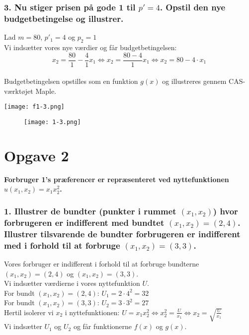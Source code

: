 \documentclass[a4paper, 12pt]{article}
\begin{document}
\subsubsection*{3. Nu stiger prisen på gode 1 til $p'=4$. Opstil den nye budgetbetingelse og illustrer.}
Lad $m=80$, $p'_{1}=4$ og $p_{2}=1$
\\
Vi indsætter vores nye værdier og får budgetbetingelsen:
$$x_{2} = \frac{80}{1} - \frac{4}{1}x_{1} \Leftrightarrow x_{2} = \frac{80 - 4}{1}x_{1} \Leftrightarrow x_{2} = 80 - 4\cdot x_{1}$$
\\
Budgetbetingelsen opstilles som en funktion $g(x)$ og illustreres gennem CAS-værktøjet Maple.

\texttt{[image: f1-3.png]}

\FloatBarrier
\begin{center}
	\begin{figure}[!ht]	
		\centering	
\texttt{[image: 1-3.png]}
		\caption{}
	\end{figure}
\end{center}
\FloatBarrier


\section*{Opgave 2}
\textbf{Forbruger 1's præferencer er repræsenteret ved nyttefunktionen $u(x_{1},x_{2}) = x_{1}x_{2}^{2}$.} 

\subsubsection*{1. Illustrer de bundter (punkter i rummet $(x_{1},x_{2})$) hvor forbrugeren er indifferent med bundtet $(x_{1},x_{2}) = (2,4)$. Illustrer tilsvarende de bundter forbrugeren er indifferent med i forhold til at forbruge $(x_{1},x_{2}) = (3,3)$. }
Vores forbruger er indifferent i forhold til at forbruge bundterne $(x_{1},x_{2}) = (2,4)$ og $(x_{1},x_{2}) = (3,3)$. \\
Vi indsætter værdierne i vores nyttefunktion $U$.\\
For bundt $(x_{1},x_{2}) = (2,4)$: $U_{1} = 2\cdot 4^{2} = 32$\\
For bundt $(x_{1},x_{2}) = (3,3)$: $U_{2} = 3\cdot 3^{2} = 27$
\\
Hertil isolerer vi $x_{2}$ i nyttefunktionen: $U = x_{1}x_{2}^{2} \Leftrightarrow x_{2}^{2} = \frac{U}{x_{1}} \Leftrightarrow x_{2} = \sqrt{\frac{U}{x_{1}}}$
\\
Vi indsætter $U_{1}$ og $U_{2}$ og får funktionerne $f(x)$ og $g(x)$.
\end{document}
